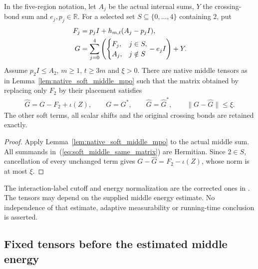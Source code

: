 \begin{lemma}
    \label{lem:five_region_soft_middle_mpo}
    \leanok
    In the five-region notation, let $A_j$ be the actual internal sums,
    $Y$ the crossing-bond sum and $e_j,p_j\in\mathbb R$. For a selected set
    $S\subseteq\{0,\ldots,4\}$ containing $2$, put
    \begin{align}
        F_j & =p_jI+h_{m,t}(A_j-p_jI),\notag \\
        G   & =\sum_{j=0}^4
        \left(\begin{cases}F_j,&j\in S,\\A_j,&j\notin S\end{cases}
        -e_jI\right)+Y.
        \label{eq:soft_middle_same_matrix}
    \end{align}
    Assume $p_2I\leq A_2$, $m\geq1$, $t\geq3m$ and $\xi>0$.
    There are native middle tensors as in
    Lemma~\ref{lem:native_soft_middle_mpo} such that the matrix obtained by
    replacing only $F_2$ by their placement satisfies
    \begin{align}
        \widehat G=G-F_2+\iota(Z),\qquad
        G=G^*,\qquad \widehat G=\widehat G^*,\qquad
        \|G-\widehat G\|\leq\xi.
        \label{eq:soft_middle_full_error}
    \end{align}
    The other soft terms, all scalar shifts and the original crossing
    bonds are retained exactly.
\end{lemma}
\begin{proof}
    \leanok
    Apply Lemma~\ref{lem:native_soft_middle_mpo} to the actual middle sum.
    All summands in~(\ref{eq:soft_middle_same_matrix}) are Hermitian.
    Since $2\in S$, cancellation of every unchanged term gives
    $G-\widehat G=F_2-\iota(Z)$, whose norm is at most $\xi$.
\end{proof}

The interaction-label cutoff and energy normalization are the corrected
ones in \cite{gap:alvv16_cluster_approximation}. The tensors may depend on
the supplied middle energy estimate. No independence of that estimate,
adaptive measurability or running-time conclusion is asserted.


\subsection{Fixed tensors before the estimated middle energy}


